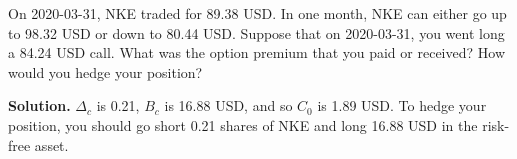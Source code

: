 \noindent On 2020-03-31, NKE traded for 89.38 USD. In one month, NKE can either go up to 98.32 USD or down to 80.44 USD. Suppose that on 2020-03-31, you went long a 84.24 USD call. What was the option premium that you paid or received? How would you hedge your position?

\vspace{9pt}

\noindent\textbf{Solution.} $\Delta_{c}$ is 0.21, $B_{c}$ is 16.88 USD, and so $C_{0}$ is 1.89 USD. To hedge your position, you should go short 0.21 shares of NKE and long 16.88 USD in the risk-free asset.
